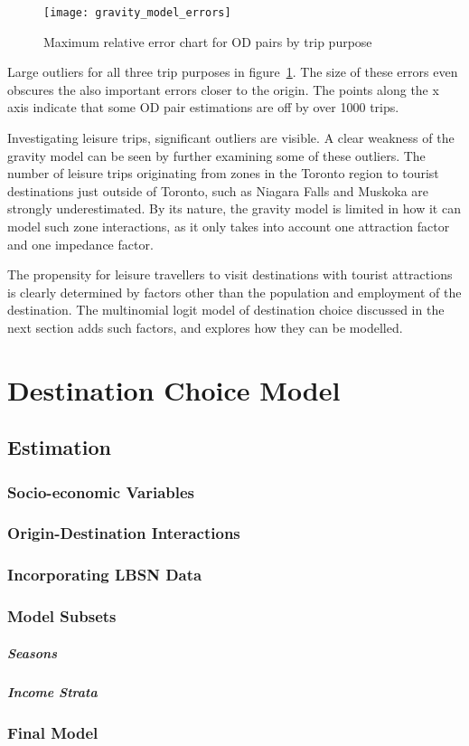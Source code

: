 \begin{figure}[H]
\centering
\texttt{[image: gravity\_model\_errors]}
\caption{Maximum relative error chart for OD pairs by trip purpose}
\label{fig:gravity-errors}
\end{figure}

Large outliers for all three trip purposes in figure~\ref{fig:gravity-errors}. The size of these errors even obscures the also important errors closer to the origin. The points along the x axis indicate that some OD pair estimations are off by over 1000 trips. 

Investigating leisure trips, significant outliers are visible. A clear weakness of the gravity model can be seen by further examining some of these outliers. The number of leisure trips originating from zones in the Toronto region to tourist destinations just outside of Toronto, such as Niagara Falls and Muskoka are strongly underestimated. By its nature, the gravity model is limited in how it can model such zone interactions, as it only takes into account one attraction factor and one impedance factor.

The propensity for leisure travellers to visit destinations with tourist attractions is clearly determined by factors other than the population and employment of the destination. The multinomial logit model of destination choice discussed in the next section adds such factors, and explores how they can be modelled.

\chapter{Destination Choice Model}
\label{section:destination-choice}

\section{Estimation}
\subsection{Socio-economic Variables}
\subsection{Origin-Destination Interactions}
\subsection{Incorporating LBSN Data}
\subsection{Model Subsets}
\paragraph{Seasons}
\paragraph{Income Strata}
\subsection{Final Model}


